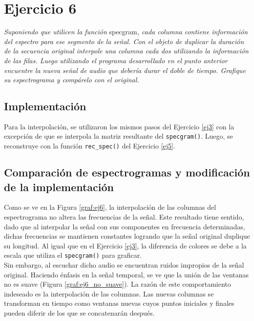 

\section{Ejercicio 6} \label{ej6}
	\begin{flushleft}
		\textit{Suponiendo que utilicen la función} specgram\textit{, cada columna contiene información del
espectro para ese segmento de la señal. Con el objeto de duplicar la duración de la secuencia
original interpole una columna cada dos utilizando la información de las filas. Luego utilizando
el programa desarrollado en el punto anterior encuentre la nueva señal de audio que debería
durar el doble de tiempo. Grafique su espectrograma y compárelo con el original.}
	\end{flushleft}

	\subsection{Implementación}

		Para la interpolación, se utilizaron los mismos pasos del Ejercicio \ref{ej3} con la excepción de que se interpola la matriz resultante del \texttt{specgram()}. Luego, se reconstruye con la función \texttt{rec\_spec()} del Ejercicio \ref{ej5}.

		\pagebreak
	\subsection{Comparación de espectrogramas y modificación de la implementación}


	Como se ve en la Figura \ref{graf:ej6}, la interpolación de las columnas del espectrograma no altera las frecuencias de la señal. Este resultado tiene sentido, dado que al interpolar la señal con sus componentes en frecuencia determinadas, dichas frecuencias se mantienen constantes logrando que la señal original duplique su longitud. Al igual que en el Ejercicio \ref{ej3}, la diferencia de colores se debe a la escala que utiliza el \texttt{specgram()} para graficar.\\

	Sin embargo, al escuchar dicho audio se encuentran ruidos impropios de la señal original. Haciendo énfasis en la señal temporal, se ve que la unión de las ventanas no es suave (Figura \ref{graf:ej6_no_suave}). La razón de este comportamiento indeseado es la interpolación de las columnas. Las nuevas columnas se transforman en tiempo como ventanas nuevas cuyos puntos iniciales y finales pueden diferir de los que se concatenarán después.\\

